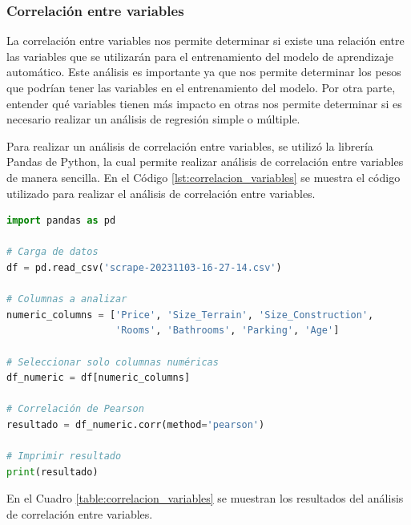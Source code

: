 \subsubsection{Correlación entre variables}

La correlación entre variables nos permite determinar si existe una relación
entre las variables que se utilizarán para el entrenamiento del modelo de
aprendizaje automático. Este análisis es importante ya que nos permite determinar
los pesos que podrían tener las variables en el entrenamiento del modelo. Por
otra parte, entender qué variables tienen más impacto en otras nos permite
determinar si es necesario realizar un análisis de regresión simple o múltiple.

Para realizar un análisis de correlación entre variables, se utilizó la librería
Pandas de Python, la cual permite realizar análisis de correlación entre variables
de manera sencilla. En el Código \ref{lst:correlacion_variables} se muestra el
código utilizado para realizar el análisis de correlación entre variables.

\begin{lstlisting}[language=Python, label=lst:correlacion_variables, caption=Correlación entre variables.]
import pandas as pd

# Carga de datos
df = pd.read_csv('scrape-20231103-16-27-14.csv')

# Columnas a analizar
numeric_columns = ['Price', 'Size_Terrain', 'Size_Construction',
                   'Rooms', 'Bathrooms', 'Parking', 'Age']

# Seleccionar solo columnas numéricas
df_numeric = df[numeric_columns]

# Correlación de Pearson
resultado = df_numeric.corr(method='pearson')

# Imprimir resultado
print(resultado)
\end{lstlisting}

En el Cuadro \ref{table:correlacion_variables} se muestran los resultados del
análisis de correlación entre variables.

